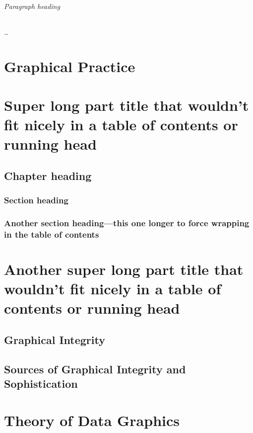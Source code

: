 \documentclass{bayeshyp}
\begin{document}
\paragraph{Paragraph heading} \ldots


\Blinddocument

\part[image={example-image-a}]{Graphical Practice}

\part[image={example-image-b},image-options={width=0.25\textwidth},toc={Shorter part title}]{Super long part title that wouldn't fit nicely in a table of contents or running head}
\chapter{Chapter heading}
\section{Section heading}
\section{Another section heading---this one longer to force wrapping in the table of contents}
\lipsum

\part[toc={Old-style, short title=this}]{Another super long part title that wouldn't fit nicely in a table of contents or running head}

\chapter{Graphical Integrity}
\setcounter{page}{53}

\chapter{Sources of Graphical Integrity and Sophistication}
\setcounter{page}{79}

\part{Theory of Data Graphics}
\end{document}
